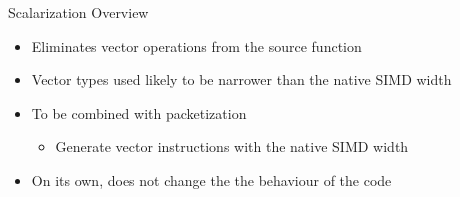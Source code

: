
\begin{frame}[fragile]{Scalarization Overview}

\begin{itemize}
    \item Eliminates vector operations from the source function
    \item Vector types used likely to be narrower than the native SIMD width
    \item To be combined with packetization
    \begin{itemize}
        \item Generate vector instructions with the native SIMD width
    \end{itemize}
    \item On its own, does not change the the behaviour of the code
\end{itemize}


\end{frame}


%
%    
%    
%

